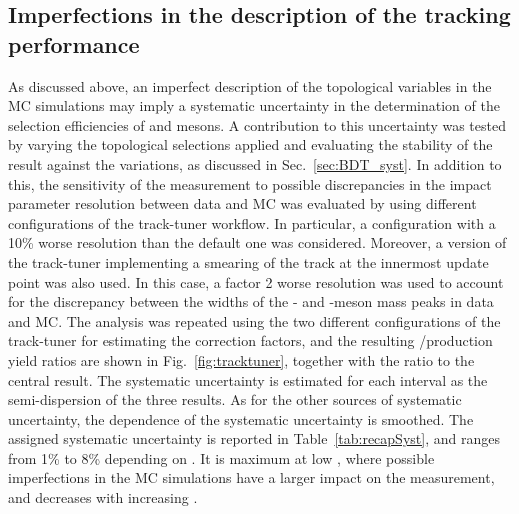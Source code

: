 \subsection{Imperfections in the description of the tracking performance}
As discussed above, an imperfect description of the topological variables in the MC simulations may imply a systematic uncertainty in the determination of the selection efficiencies of \ds and \dpl mesons. A contribution to this uncertainty was tested by varying the topological selections applied and evaluating the stability of the result against the variations, as discussed in Sec.~\ref{sec:BDT_syst}. In addition to this, the sensitivity of the measurement to possible discrepancies in the impact parameter resolution between data and MC was evaluated by using different configurations of the track-tuner workflow. In particular, a configuration with a 10\% worse resolution than the default one was considered. Moreover, a version of the track-tuner implementing a smearing of the track \pt at the innermost update point was also used. In this case, a factor 2 worse \pt resolution was used to account for the discrepancy between the widths of the \ds- and \dpl-meson mass peaks in data and MC. The analysis was repeated using the two different configurations of the track-tuner for estimating the correction factors, and the resulting \ds/\dpl production yield ratios are shown in Fig.~\ref{fig:tracktuner}, together with the ratio to the central result. The systematic uncertainty is estimated for each \pt interval as the semi-dispersion of the three results. As for the other sources of systematic uncertainty, the \pt dependence of the systematic uncertainty is smoothed. The assigned systematic uncertainty is reported in Table~\ref{tab:recapSyst}, and ranges from 1\% to 8\% depending on \pt. It is maximum at low \pt, where possible imperfections in the MC simulations have a larger impact on the measurement, and decreases with increasing \pt.

